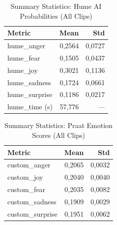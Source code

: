   \begin{table}[H]
    \centering
    
    \begin{tabular}{lrr}
      \toprule
      \textbf{Metric}         & \textbf{Mean}   & \textbf{Std}    \\
      \midrule
      hume\_anger             & 0,2564          & 0,0727          \\
      hume\_fear              & 0,1505          & 0,0437          \\
      hume\_joy               & 0,3021          & 0,1136          \\
      hume\_sadness           & 0,1724          & 0,0661          \\
      hume\_surprise          & 0,1186          & 0,0217          \\
      hume\_time (s)          & 57,776          & ---             \\
      \bottomrule
    \end{tabular}
    \caption{Summary Statistics: Hume AI Probabilities (All Clips)}
    \label{tab:summary_hume_probabilities}
  \end{table}
  
  
  \begin{table}[H]
    \centering
    \caption{Summary Statistics: Praat Emotion Scores (All Clips)}
    \label{tab:summary_praat_scores}
    \begin{tabular}{lrr}
      \toprule
      \textbf{Metric}           & \textbf{Mean}   & \textbf{Std}    \\
      \midrule
      custom\_anger              & 0,2065          & 0,0032          \\
      custom\_joy                & 0,2040          & 0,0040          \\
      custom\_fear               & 0,2035          & 0,0082          \\
      custom\_sadness            & 0,1909          & 0,0029          \\
      custom\_surprise           & 0,1951          & 0,0062          \\
      \bottomrule
    \end{tabular}
  \end{table}
  

